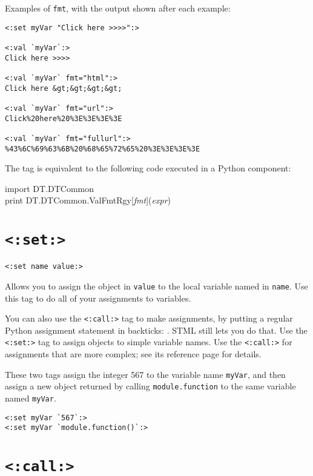 \documentclass{manual}
\begin{document}
Examples of \texttt{fmt}, with the output shown after each example:

\begin{verbatim}
<:set myVar "Click here >>>>":>

<:val `myVar`:>
Click here >>>>

<:val `myVar` fmt="html":>
Click here &gt;&gt;&gt;&gt;

<:val `myVar` fmt="url":>
Click%20here%20%3E%3E%3E%3E

<:val `myVar` fmt="fullurl":>
%43%6C%69%63%6B%20%68%65%72%65%20%3E%3E%3E%3E
\end{verbatim}


The  tag is equivalent to the following code executed
in a Python component:

\begin{obeylines} \ttfamily
import DT.DTCommon
print DT.DTCommon.ValFmtRgy[\emph{fmt}](\emph{expr})
\end{obeylines}



\section{\texttt{<:set:>}}
\label{tagset}

\begin{verbatim}
<:set name value:>
\end{verbatim}

Allows you to assign the object in \texttt{value} to the
local variable named in \texttt{name}. Use this tag to do
all of your assignments to variables.

You can also use the
\texttt{<:call:>}  tag to
make assignments, by putting a regular Python assignment
statement in backticks: .
STML still lets you do that. Use the \texttt{<:set:>} tag
to assign objects to simple variable names. Use the 
\texttt{<:call:>} for assignments that are more complex;
see its reference page for details.

These two tags assign the integer 567 to the variable name \texttt{myVar},
and then assign a new object returned by calling \texttt{module.function}
to the same variable named \texttt{myVar}.

\begin{verbatim}
<:set myVar `567`:>
<:set myVar `module.function()`:>
\end{verbatim}




\section{\texttt{<:call:>}}
\label{tagcall}
\end{document}
